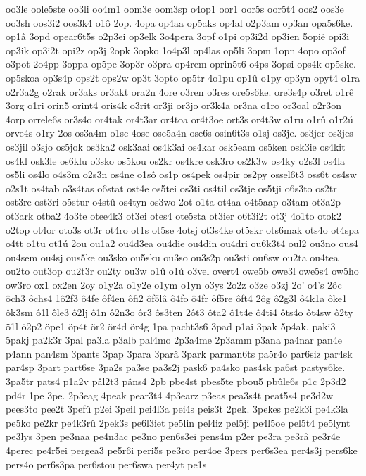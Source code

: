 {oo3le
oole5ste
oo3li
oo4m1
oom3e
oom3sp
o4op1
oor1
oor5s
oor5t4
oos2
oos3e
oo3sh
oos3i2
oos3k4
o1ô
2op.
4opa
op4aa
op5aks
op4al
o2p3am
op3an
opa5s6ke.
op1â
3opd
opear6t5s
o2p3ei
op3elk
3o4pera
3opf
o1pi
op3i2d
op3ien
5opië
opi3i
op3ik
op3i2t
opi2z
op3j
2opk
3opko
1o4p3l
op4las
op5li
3opm
1opn
4opo
op3of
o3pot
2o4pp
3oppa
op5pe
3op3r
o3pra
op4rem
oprin5t6
o4ps
3opsi
ops4k
op5ske.
op5skoa
op3s4p
ops2t
ops2w
op3t
3opto
op5tr
4o1pu
op1û
o1py
op3yn
opyt4
o1ra
o2r3a2g
o2rak
or3aks
or3akt
ora2n
4ore
o3ren
o3res
ore5s6ke.
ore3s4p
o3ret
o1rê
3org
o1ri
orin5
orint4
oris4k
o3rit
or3ji
or3jo
or3k4a
or3na
o1ro
or3oal
o2r3on
4orp
orrele6s
or3s4o
or4tak
or4t3ar
or4toa
or4t3oe
ort3s
or4t3w
o1ru
o1rû
o1r2ú
orve4s
o1ry
2os
os3a4m
o1sc
4ose
ose5a4n
ose6s
osin6t3s
o1sj
os3je.
os3jer
os3jes
os3jil
o3sjo
os5jok
os3ka2
osk3aai
os4k3ai
os4kar
osk5eam
os5ken
osk3ie
os4kit
os4kl
osk3le
os6klu
o3sko
os5kou
os2kr
os4kre
osk3ro
os2k3w
os4ky
o2s3l
os4la
os5li
os4lo
o4s3m
o2s3n
os4ne
o1sô
os1p
os4pek
os4pir
os2py
ossel6t3
oss6t
os4sw
o2s1t
os4tab
o3s4tas
o6stat
ost4e
os5tei
os3ti
os4til
os3tje
os5tji
o6s3to
os2tr
ost3re
ost3ri
o5stur
o4stû
os4tyn
os3wo
2ot
o1ta
ot4aa
o4t5aap
o3tam
ot3a2p
ot3ark
otba2
4o3te
otee4k3
ot3ei
otes4
ote5sta
ot3ier
o6t3i2t
ot3j
4o1to
otok2
o2top
ot4or
oto3s
ot3r
ot4ro
ot1s
ot5se
4otsj
ot3s4ke
ot5skr
ots6mak
ots4o
ot4spa
o4tt
o1tu
ot1ú
2ou
ou1a2
ou4d3ea
ou4die
ou4din
ou4dri
ou6k3t4
oul2
ou3no
ous4
ou4sem
ou4sj
ous5ke
ou3sko
ou5sku
ou3so
ou3s2p
ou3sti
ou6sw
ou2ta
ou4tea
ou2to
out3op
ou2t3r
ou2ty
ou3w
o1û
o1ú
o3vel
overt4
owe5b
owe3l
owe5s4
ow5ho
ow3ro
ox1
ox2en
2oy
o1y2a
o1y2e
o1ym
o1yn
o3ys
2o2z
o3ze
o3zj
2o'
o4's
2ôc
ôch3
ôchs4
1ô2f3
ô4fe
ôf4en
ôfi2
ôf5lâ
ô4fo
ô4fr
ôf5re
ôft4
2ôg
ô2g3l
ô4k1a
ôke1
ôk3sm
ô1l
ôle3
ô2lj
ô1n
ô2n3o
ôr3
ôs3ten
2ôt3
ôta2
ô1t4e
ô4ti4
ôts4o
ôt4sw
ô2ty
ö1l
ö2p2
öpe1
öp4t
ör2
ör4d
ör4g
1pa
pacht3s6
3pad
p1ai
3pak
5p4ak.
paki3
5pakj
pa2k3r
3pal
pa3la
p3alb
pal4mo
2p3a4me
2p3amm
p3ana
pa4nar
pan4e
p4ann
pan4sm
3pants
3pap
3para
3parâ
3park
parman6ts
pa5r4o
par6siz
par4sk
par4sp
3part
part6se
3pa2s
pa3se
pa3s2j
pask6
pa4sko
pas4sk
pa6st
pastys6ke.
3pa5tr
pats4
p1a2v
pâl2t3
pâns4
2pb
pbe4st
pbes5te
pbou5
pbûle6s
p1c
2p3d2
pd4r
1pe
3pe.
2p3eag
4peak
pear3t4
4p3earz
p3eas
pea3s4t
peat5s4
pe3d2w
pees3to
pee2t
3pefû
p2ei
3peil
pei4l3a
pei4s
peis3t
2pek.
3pekes
pe2k3i
pe4k3la
pe5ko
pe2kr
pe4k3rû
2pek3s
pe6l3iet
pe5lin
pel4iz
pel5ji
pe4l5oe
pel5t4
pe5lynt
pe3lys
3pen
pe3naa
pe4n3ac
pe3no
pen6s3ei
pens4m
p2er
pe3ra
pe3râ
pe3r4e
4perec
pe4r5ei
pergea3
pe5r6i
peri5s
pe3ro
per4oe
3pers
per6s3ea
per4s3j
pers6ke
pers4o
per6s3pa
per6stou
per6swa
per4yt
pe1s
}
